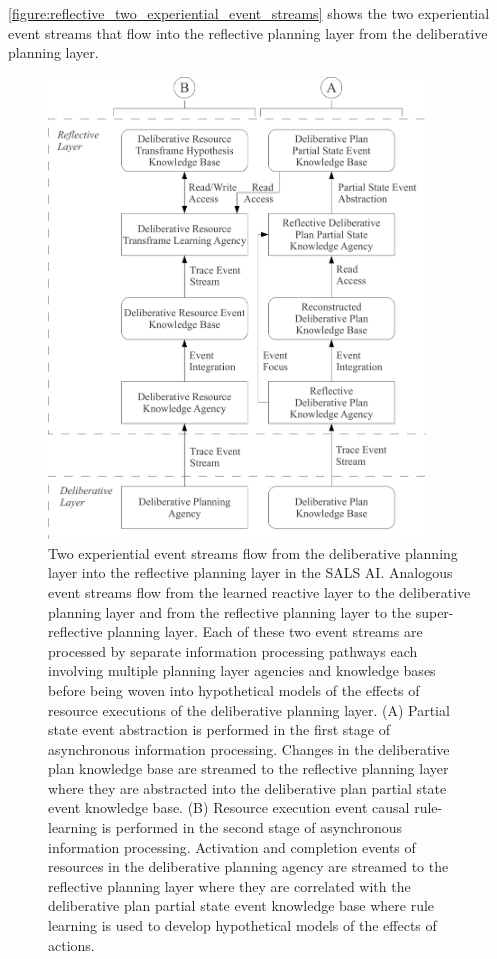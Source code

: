 {\mbox{\autoref{figure:reflective_two_experiential_event_streams}}}
shows the two experiential event streams that flow into the reflective
planning layer from the deliberative planning layer.
\begin{figure}
\centering
\includegraphics[width=10cm]{gfx/reflective_two_experiential_event_streams}
\caption[Two experiential event streams flow from the deliberative
  planning layer into the reflective planning layer in the SALS
  AI.]{Two experiential event streams flow from the deliberative
  planning layer into the reflective planning layer in the SALS AI.
  Analogous event streams flow from the learned reactive layer to the
  deliberative planning layer and from the reflective planning layer
  to the super-reflective planning layer.  Each of these two event
  streams are processed by separate information processing pathways
  each involving multiple planning layer agencies and knowledge bases
  before being woven into hypothetical models of the effects of
  resource executions of the deliberative planning layer.  (A)
  Partial state event abstraction is performed in the first stage of
  asynchronous information processing.  Changes in the deliberative
  plan knowledge base are streamed to the reflective planning layer
  where they are abstracted into the deliberative plan partial state
  event knowledge base.  (B) Resource execution event causal
  rule-learning is performed in the second stage of asynchronous
  information processing.  Activation and completion events of
  resources in the deliberative planning agency are streamed to the
  reflective planning layer where they are correlated with the
  deliberative plan partial state event knowledge base where rule
  learning is used to develop hypothetical models of the effects of
  actions.}
\label{figure:reflective_two_experiential_event_streams}
\end{figure}
